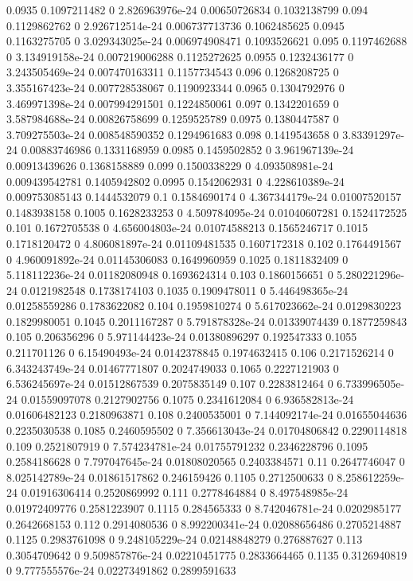 {0.0935 0.1097211482 0 2.826963976e-24 0.00650726834 0.1032138799
0.094 0.1129862762 0 2.926712514e-24 0.006737713736 0.1062485625
0.0945 0.1163275705 0 3.029343025e-24 0.006974908471 0.1093526621
0.095 0.1197462688 0 3.134919158e-24 0.007219006288 0.1125272625
0.0955 0.1232436177 0 3.243505469e-24 0.007470163311 0.1157734543
0.096 0.1268208725 0 3.355167423e-24 0.007728538067 0.1190923344
0.0965 0.1304792976 0 3.469971398e-24 0.007994291501 0.1224850061
0.097 0.1342201659 0 3.587984688e-24 0.00826758699 0.1259525789
0.0975 0.1380447587 0 3.709275503e-24 0.008548590352 0.1294961683
0.098 0.1419543658 0 3.83391297e-24 0.00883746986 0.1331168959
0.0985 0.1459502852 0 3.961967139e-24 0.00913439626 0.1368158889
0.099 0.1500338229 0 4.093508981e-24 0.009439542781 0.1405942802
0.0995 0.1542062931 0 4.228610389e-24 0.009753085143 0.1444532079
0.1 0.1584690174 0 4.367344179e-24 0.01007520157 0.1483938158
0.1005 0.1628233253 0 4.509784095e-24 0.01040607281 0.1524172525
0.101 0.1672705538 0 4.656004803e-24 0.01074588213 0.1565246717
0.1015 0.1718120472 0 4.806081897e-24 0.01109481535 0.1607172318
0.102 0.1764491567 0 4.960091892e-24 0.01145306083 0.1649960959
0.1025 0.1811832409 0 5.118112236e-24 0.01182080948 0.1693624314
0.103 0.1860156651 0 5.280221296e-24 0.0121982548 0.1738174103
0.1035 0.1909478011 0 5.446498365e-24 0.01258559286 0.1783622082
0.104 0.1959810274 0 5.617023662e-24 0.0129830223 0.1829980051
0.1045 0.2011167287 0 5.791878328e-24 0.01339074439 0.1877259843
0.105 0.206356296 0 5.971144423e-24 0.01380896297 0.192547333
0.1055 0.211701126 0 6.15490493e-24 0.0142378845 0.1974632415
0.106 0.2171526214 0 6.343243749e-24 0.01467771807 0.2024749033
0.1065 0.2227121903 0 6.536245697e-24 0.01512867539 0.2075835149
0.107 0.2283812464 0 6.733996505e-24 0.01559097078 0.2127902756
0.1075 0.2341612084 0 6.936582813e-24 0.01606482123 0.2180963871
0.108 0.2400535001 0 7.144092174e-24 0.01655044636 0.2235030538
0.1085 0.2460595502 0 7.356613043e-24 0.01704806842 0.2290114818
0.109 0.2521807919 0 7.574234781e-24 0.01755791232 0.2346228796
0.1095 0.2584186628 0 7.797047645e-24 0.01808020565 0.2403384571
0.11 0.2647746047 0 8.025142789e-24 0.01861517862 0.246159426
0.1105 0.2712500633 0 8.258612259e-24 0.01916306414 0.2520869992
0.111 0.2778464884 0 8.497548985e-24 0.01972409776 0.2581223907
0.1115 0.284565333 0 8.742046781e-24 0.0202985177 0.2642668153
0.112 0.2914080536 0 8.992200341e-24 0.02088656486 0.2705214887
0.1125 0.2983761098 0 9.248105229e-24 0.02148848279 0.276887627
0.113 0.3054709642 0 9.509857876e-24 0.02210451775 0.2833664465
0.1135 0.3126940819 0 9.777555576e-24 0.02273491862 0.2899591633
}
